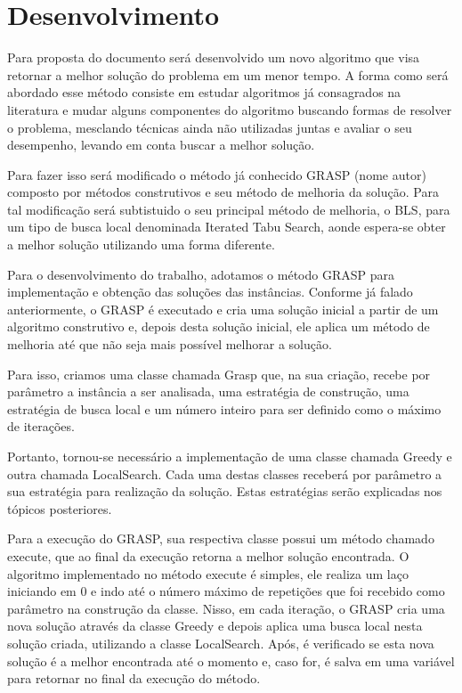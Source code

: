 \documentclass[12pt]{article}
\begin{document}
\section{Desenvolvimento}

Para proposta do documento será desenvolvido um novo algoritmo que visa retornar a melhor solução do problema em um menor tempo. A forma como será abordado esse método consiste em estudar algoritmos já consagrados na literatura e mudar alguns componentes do algoritmo buscando formas de resolver o problema, mesclando técnicas ainda não utilizadas juntas e avaliar o seu desempenho, levando em conta buscar a melhor solução.

Para fazer isso será modificado o método já conhecido GRASP (nome autor) composto por métodos construtivos e seu método de melhoria da solução. Para tal modificação será subtistuido o seu principal método de melhoria, o BLS, para um tipo de busca local denominada Iterated Tabu Search, aonde espera-se obter a melhor solução utilizando uma forma diferente.

Para o desenvolvimento do trabalho, adotamos o método GRASP para implementação e obtenção das soluções das instâncias.
Conforme já falado anteriormente, o GRASP é executado e cria uma solução inicial a partir de um algoritmo construtivo e, depois desta solução inicial, ele aplica um método de melhoria até que não seja mais possível melhorar a solução.

Para isso, criamos uma classe chamada Grasp que, na sua criação, recebe por parâmetro a instância a ser analisada, uma estratégia de construção, uma estratégia de busca local e um número inteiro para ser definido como o máximo de iterações.

Portanto, tornou-se necessário a implementação de uma classe chamada Greedy e outra chamada LocalSearch. Cada uma destas classes receberá por parâmetro a sua estratégia para realização da solução. Estas estratégias serão explicadas nos tópicos posteriores.

Para a execução do GRASP, sua respectiva classe possui um método chamado execute, que ao final da execução retorna a melhor solução encontrada. O algoritmo implementado no método execute é simples, ele realiza um laço iniciando em 0 e indo até o número máximo de repetições que foi recebido como parâmetro na construção da classe. Nisso, em cada iteração, o GRASP cria uma nova solução através da classe Greedy e depois aplica uma busca local nesta solução criada, utilizando a classe LocalSearch. Após, é verificado se esta nova solução é a melhor encontrada até o momento e, caso for, é salva em uma variável para retornar no final da execução do método.
\end{document}
